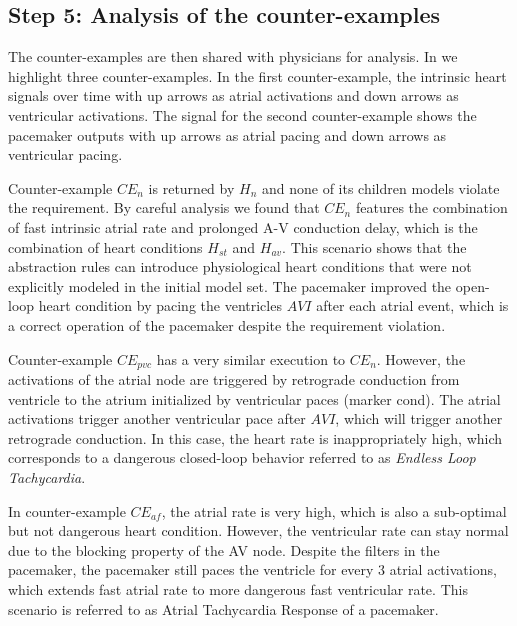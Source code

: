 	\vspace{-10pt}
\subsection*{Step 5: Analysis of the counter-examples}
The counter-examples are then shared with physicians for analysis. In  we highlight three counter-examples. In the first counter-example, the intrinsic heart signals over time with up arrows as atrial activations and down arrows as ventricular activations. The signal for the second counter-example shows the pacemaker outputs with up arrows as atrial pacing and down arrows as ventricular pacing.%

Counter-example $CE_{n}$ is returned by $H_n$ and none of its children models violate the requirement. By careful analysis we found that $CE_{n}$ features the combination of fast intrinsic atrial rate and prolonged A-V conduction delay, which is the combination of heart conditions $H_{st}$ and $H_{av}$. This scenario shows that the abstraction rules can introduce physiological heart conditions that were not explicitly modeled in the initial model set. The pacemaker improved the open-loop heart condition by pacing the ventricles $AVI$ after each atrial event, which is a correct operation of the pacemaker despite the requirement violation. 

Counter-example $CE_{pvc}$ has a very similar execution to $CE_{n}$. However, the activations of the atrial node are triggered by retrograde conduction from ventricle to the atrium initialized by ventricular paces (marker \textsf{cond}). The atrial activations trigger another ventricular pace after $AVI$, which will trigger another retrograde conduction. In this case, the heart rate is inappropriately high, which corresponds to a dangerous closed-loop behavior referred to as \emph{Endless Loop Tachycardia}.

In counter-example $CE_{af}$, the atrial rate is very high, which is also a sub-optimal but not dangerous heart condition. 
However, the ventricular rate can stay normal due to the blocking property of the AV node. 
Despite the filters in the pacemaker, the pacemaker still paces the ventricle for every 3 atrial activations, which extends fast atrial rate to more dangerous fast ventricular rate. 
This scenario is referred to as Atrial Tachycardia Response of a pacemaker. 

